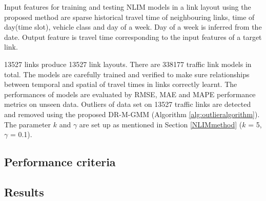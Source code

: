 \documentclass[journal]{IEEEtran}
\begin{document}
Input features for training and testing NLIM models in a link layout using the proposed method are sparse historical travel time of neighbouring links, time of day(time slot), vehicle class and day of a week. Day of a week is inferred from the date. Output feature is travel time corresponding to the input features of a target link.

13527 links produce 13527 link layouts. There are 338177 traffic link models in total. The models  are carefully trained and verified to make sure relationships between temporal and spatial of travel times in links correctly learnt. The performances of models are evaluated by RMSE, MAE and MAPE performance metrics on unseen data. Outliers of data set on 13527 traffic links are detected and removed using the proposed DR-M-GMM (Algorithm \ref{alg:outlieralgorithm}). The parameter $k$ and $\gamma$ are set up as mentioned in Section \ref{NLIMmethod} ($k$ = 5, $\gamma$ = 0.1).
\subsection{Performance criteria}
\subsection{Results}
\end{document}
